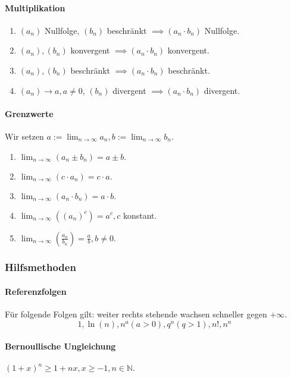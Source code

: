 \documentclass[a4paper, 9pt, DIV=24]{scrartcl}
\newcommand{\N}{\mathbb{N}}
\begin{document}
\paragraph{Multiplikation}
\begin{enumerate}[label={(}\arabic*{)}]
 \item $(a_n)$ Nullfolge, $(b_n)$ beschränkt $\implies (a_n \cdot b_n)$ Nullfolge.
 \item $(a_n), (b_n)$ konvergent $\implies (a_n \cdot b_n)$ konvergent.
 \item $(a_n), (b_n)$ beschränkt $\implies (a_n \cdot b_n)$ beschränkt.
 \item $(a_n) \rightarrow a, a \neq 0$, $(b_n)$ divergent $\implies (a_n \cdot b_n)$ divergent.
\end{enumerate}
\paragraph{Grenzwerte} Wir setzen $a := \lim_{n\rightarrow\infty} a_n, b := \lim_{n\rightarrow\infty} b_n.$
\begin{enumerate}[label={(}\arabic*{)}]
 \item $\lim_{n\rightarrow\infty}(a_n \pm b_n) = a \pm b.$
 \item $\lim_{n\rightarrow\infty}(c\cdot a_n) = c\cdot a.$
 \item $\lim_{n\rightarrow\infty}(a_n \cdot b_n) = a \cdot b.$
 \item $\lim_{n\rightarrow\infty}((a_n)^c) = a^c, c$ konstant.
 \item $\lim_{n\rightarrow\infty}(\frac{a_n}{b_n}) = \frac{a}{b}, b \neq 0.$
\end{enumerate}

\subsubsection{Hilfsmethoden}
\paragraph{Referenzfolgen}
Für folgende Folgen gilt: weiter rechts stehende wachsen schneller gegen $+\infty$.
\[1, \ln(n), n^a (a > 0), q^n (q > 1), n!, n^n\]

\paragraph{Bernoullische Ungleichung}
$(1+x)^n \geq 1 + nx, x \geq -1, n \in \N.$
\end{document}

